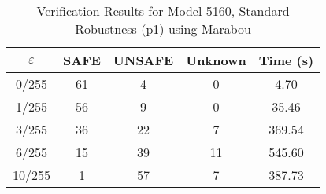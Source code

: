 \begin{table}[htbp]
\centering
\caption{Verification Results for Model 5160, Standard Robustness (p1) using Marabou}
\label{tab:model5160_p1_marabou}
\begin{tabular}{|c|c|c|c|c|}
\hline
$\varepsilon$ & SAFE & UNSAFE & Unknown & Time (s) \\ \hline
0/255 & 61 & 4 & 0 & 4.70 \\ \hline
1/255 & 56 & 9 & 0 & 35.46 \\ \hline
3/255 & 36 & 22 & 7 & 369.54 \\ \hline
6/255 & 15 & 39 & 11 & 545.60 \\ \hline
10/255 & 1 & 57 & 7 & 387.73 \\ \hline
\end{tabular}
\end{table}
